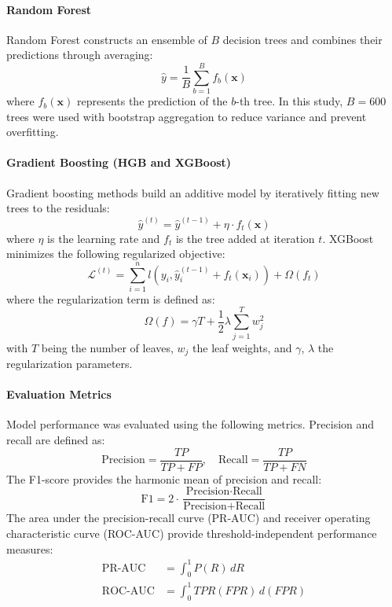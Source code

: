 \documentclass[fleqn,10pt,lineno]{wlpeerj}
\begin{document}
\paragraph{Random Forest}
Random Forest constructs an ensemble of $B$ decision trees and combines their predictions through averaging:
\begin{equation}
\hat{y} = \frac{1}{B}\sum_{b=1}^{B} f_b(\mathbf{x})
\label{eq:rf}
\end{equation}
where $f_b(\mathbf{x})$ represents the prediction of the $b$-th tree. In this study, $B=600$ trees were used with bootstrap aggregation to reduce variance and prevent overfitting.

\paragraph{Gradient Boosting (HGB and XGBoost)}
Gradient boosting methods build an additive model by iteratively fitting new trees to the residuals:
\begin{equation}
\hat{y}^{(t)} = \hat{y}^{(t-1)} + \eta \cdot f_t(\mathbf{x})
\label{eq:gb}
\end{equation}
where $\eta$ is the learning rate and $f_t$ is the tree added at iteration $t$. XGBoost minimizes the following regularized objective:
\begin{equation}
\mathcal{L}^{(t)} = \sum_{i=1}^{n} l(y_i, \hat{y}_i^{(t-1)} + f_t(\mathbf{x}_i)) + \Omega(f_t)
\label{eq:xgb_obj}
\end{equation}
where the regularization term is defined as:
\begin{equation}
\Omega(f) = \gamma T + \frac{1}{2}\lambda\sum_{j=1}^{T}w_j^2
\label{eq:xgb_reg}
\end{equation}
with $T$ being the number of leaves, $w_j$ the leaf weights, and $\gamma$, $\lambda$ the regularization parameters.

\paragraph{Evaluation Metrics}
Model performance was evaluated using the following metrics. Precision and recall are defined as:
\begin{equation}
\text{Precision} = \frac{TP}{TP + FP}, \quad \text{Recall} = \frac{TP}{TP + FN}
\label{eq:prec_rec}
\end{equation}
The F1-score provides the harmonic mean of precision and recall:
\begin{equation}
\text{F1} = 2 \cdot \frac{\text{Precision} \cdot \text{Recall}}{\text{Precision} + \text{Recall}}
\label{eq:f1}
\end{equation}
The area under the precision-recall curve (PR-AUC) and receiver operating characteristic curve (ROC-AUC) provide threshold-independent performance measures:
\begin{align}
\text{PR-AUC} &= \int_0^1 P(R) \, dR \label{eq:prauc} \\
\text{ROC-AUC} &= \int_0^1 TPR(FPR) \, d(FPR) \label{eq:rocauc}
\end{align}
\end{document}
